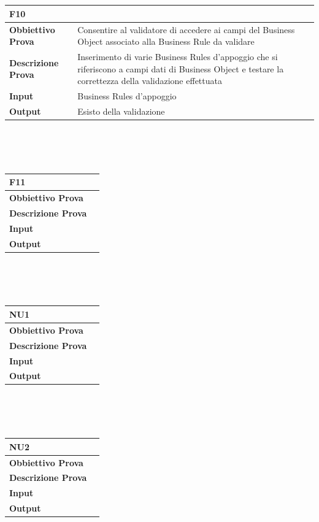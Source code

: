 \documentclass[11pt,titlepage,a4paper]{report}
\begin{document}
\\
\\
\begin{tabular}{||p{4.5cm}||p{7.5cm}||}
\hline
\textbf{\textsf{F10}}& \\
\hline
{\textbf {Obbiettivo Prova}}& Consentire al validatore di accedere ai campi del Business Object associato alla Business Rule da validare \\ \hline
{\textbf{Descrizione Prova}}&  Inserimento di varie Business Rules d'appoggio che si riferiscono a campi dati di Business Object e testare la correttezza della validazione effettuata \\ \hline
{\textbf{Input}}&  Business Rules d'appoggio \\ \hline
{\textbf{Output}}& Esisto della validazione \\ \hline
\end{tabular} \\
\\
\\
\begin{tabular}{||p{4.5cm}||p{7.5cm}||}
\hline
\textbf{\textsf{F11}}& \\
\hline
{\textbf {Obbiettivo Prova}}& \\ \hline
{\textbf{Descrizione Prova}}&  \\ \hline
{\textbf{Input}}&  \\ \hline
{\textbf{Output}}& \\ \hline
\end{tabular} \\
\\
\\
\begin{tabular}{||p{4.5cm}||p{7.5cm}||}
\hline
\textbf{\textsf{NU1}}& \\
\hline
{\textbf {Obbiettivo Prova}}& \\ \hline
{\textbf{Descrizione Prova}}&  \\ \hline
{\textbf{Input}}&  \\ \hline
{\textbf{Output}}& \\ \hline
\end{tabular} \\
\\
\\
\begin{tabular}{||p{4.5cm}||p{7.5cm}||}
\hline
\textbf{\textsf{NU2}}& \\
\hline
{\textbf {Obbiettivo Prova}}& \\ \hline
{\textbf{Descrizione Prova}}&  \\ \hline
{\textbf{Input}}&  \\ \hline
{\textbf{Output}}& \\ \hline
\end{tabular} \\
\end{document}
